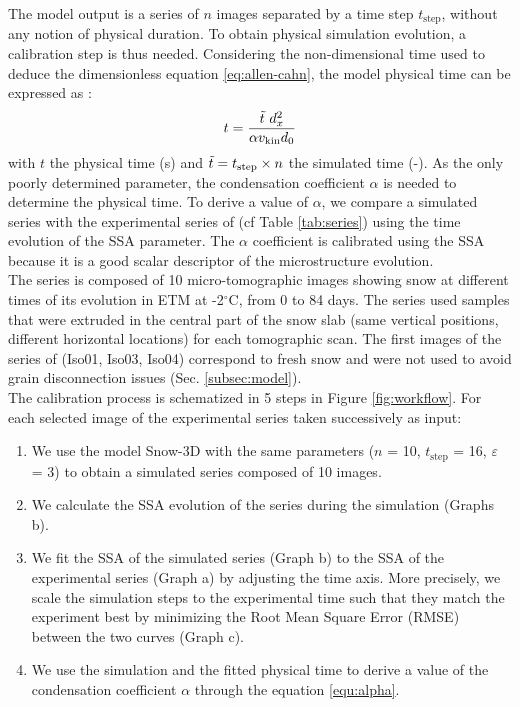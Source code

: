 \documentclass[draft,ms]{agujournal2019}
\begin{document}
 The model output is a series of $n$ images separated by a time step $t_{\mathrm{step}}$, without any notion of physical duration. To obtain physical simulation evolution, a calibration step is thus needed.
Considering the non-dimensional time used to deduce the dimensionless equation \eqref{eq:allen-cahn}, the model physical time can be expressed as \cite{bretin_and_denis_discrete-continuous_2015}: 
\begin{equation}\label{equ:alpha}
   t = \frac{\Tilde{t}\ d_x^2}{\alpha v_{\mathrm{kin}} d_0}
\end{equation}
with $t$ the physical time (s) and $\Tilde{t} = t_{\mathrm{step}} \times n$ the simulated time (-). As the only poorly determined parameter, the condensation coefficient $\alpha$ is needed to determine the physical time. To derive a value of $\alpha$, we compare a simulated series with the experimental series of  (cf Table \ref{tab:series}) using the time evolution of the SSA parameter. The $\alpha$ coefficient is calibrated using the SSA because it is a good scalar descriptor of the microstructure evolution.\\
The series is composed of 10 micro-tomographic images showing snow at different times of its evolution in ETM at -2$^\circ$C, from 0 to 84 days. The series used samples that were extruded in the central part of the snow slab (same vertical positions, different horizontal locations) for each tomographic scan. The first images of the series of  (Iso01, Iso03, Iso04) correspond to fresh snow and were not used to avoid grain disconnection issues (Sec. \ref{subsec:model}).\\
The calibration process is schematized in 5 steps in Figure \ref{fig:workflow}. For each selected image of the experimental series taken successively as input: \\
\begin{enumerate}
    \item We use the model Snow-3D with the same parameters ($n$ = 10, $t_{\mathrm{step}}$ = 16, $\varepsilon$ = 3) to obtain a simulated series composed of 10 images. 
    \item We calculate the SSA evolution of the series during the simulation (Graphs b).
    \item We fit the SSA of the simulated series (Graph b) to the SSA of the experimental series (Graph a) by adjusting the time axis. More precisely, we scale the simulation steps to the experimental time such that they match the experiment best by minimizing the Root Mean Square Error (RMSE) between the two curves (Graph c).   
    \item We use the simulation and the fitted physical time to derive a value of the condensation coefficient $\alpha$ through the equation \eqref{equ:alpha}. 
\end{enumerate}
\end{document}
